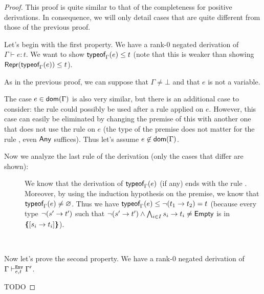 \documentclass[a4paper]{article}
\theoremstyle{definition}
\begin{document}
  \begin{proof}
    This proof is quite similar to that of the completeness for positive derivations.
    In consequence, we will only detail cases that are quite different from those of the previous proof.

    Let's begin with the first property. We have a rank-0 negated derivation of $\Gamma \vdash e:t$.
    We want to show $\textsf{typeof}_{\Gamma}(e) \leq t$ (note that this is weaker than showing $\textsf{Repr}(\textsf{typeof}_{\Gamma}(e)) \leq t$).

    As in the previous proof, we can suppose that $\Gamma \neq \bot$ and that $e$ is not a variable.

    The case $e\in\textsf{dom}(\Gamma)$ is also very similar, but there is an additional case to consider:
    the rule  could possibly be used after a rule  applied on $e$.
    However, this case can easily be eliminated by changing the premise of this  with another one
    that does not use the rule  on $e$ (the type of the premise does not matter for the rule ,
    even $\textsf{Any}$ suffices). Thus let's assume $e\not\in\textsf{dom}(\Gamma)$.

    Now we analyze the last rule of the derivation (only the cases that differ are shown):
    \begin{description}
      \item[] We know that the derivation of $\textsf{typeof}_{\Gamma}(e)$ (if any) ends with the rule .
      Moreover, by using the induction hypothesis on the premise, we know that $\textsf{typeof}_{\Gamma}(e) \neq \varnothing$.
      Thus we have $\textsf{typeof}_{\Gamma}(e) \leq \neg (t_1\to t_2) = t$ (because every type $\neg (s'\to t')$
      such that $\neg (s'\to t') \land \bigwedge_{i\in I} s_i\to t_i \neq \textsf{Empty}$ is in $\textbf{\textup{\{}}{[}s_i\to t_i]\textbf{\textup{\}}}$).
    \end{description}

    \ 

    Now let's prove the second property. We have a rank-0 negated derivation of $\Gamma \vdash^{\texttt{Env}}_{e,t} \Gamma'$.

    TODO
  \end{proof}
\end{document}
